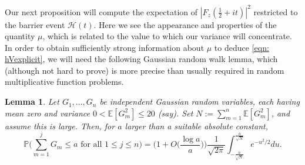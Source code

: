 \documentclass[12pt, notitlepage]{amsart}
\numberwithin{equation}{section}
\def\P{\mathbb P}
\def\E{\mathbb E}
\newtheorem{lemma}[theorem]{Lemma}
\theoremstyle{remark}
\theoremstyle{definition}
\theoremstyle{remark}
\numberwithin{equation}{section}
\begin{document}

Our next proposition will compute the expectation of $|F_z(\frac{1}{2} + it)|^{2}$ restricted to the barrier event $\mathcal{H}(t)$. Here we see the appearance and properties of the quantity $\mu$, which is related to the value to which our variance will concentrate. In order to obtain sufficiently strong information about $\mu$ to deduce \eqref{eqn: hVexplicit}, we will need the following Gaussian random walk lemma, which (although not hard to prove) is more precise than usually required in random multiplicative function problems.

\begin{lemma}\label{lemma: rwasymp}
Let $G_1 , ..., G_n$ be independent Gaussian random variables, each having mean zero and variance $0 < \E [G_m^2] \leq 20$ (say). Set $N:= \sum_{m=1}^{n} \E [G_m^2]$, and assume this is large. Then, for $a$ larger than a suitable absolute constant, 
$$ 
\P\Big(\sum_{m=1}^{j} G_m \leq a  \text{  for all } 1 \leq j \leq n\Big) = \Big(1 + O\Big( \frac{\log a}{a} \Big) \Big) \frac{1}{\sqrt{2\pi}} \int_{-\frac{a}{\sqrt{N}}}^{\frac{a}{\sqrt{N}}} e^{-u^{2}/2} du . 
$$
\end{lemma}
\end{document}
